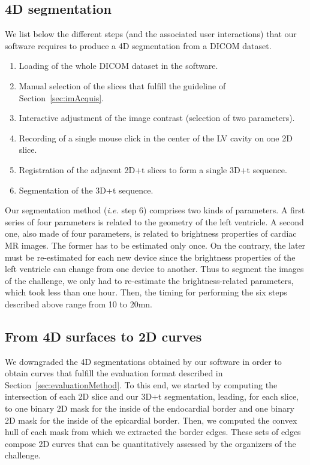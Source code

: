 \documentclass{llncs}
\newcommand{\ie}[0]{{\em i.e.}\xspace}
\begin{document}
\subsection{4D segmentation}
\label{subsec:segmentationSteps}
We list below the different steps (and the associated user
interactions) that our software requires to produce a 4D segmentation
from a DICOM dataset.
\begin{enumerate}
\item Loading of the whole DICOM dataset in the software.
\item Manual selection of the slices that fulfill the guideline of
  Section~\ref{sec:imAcquis}.
\item Interactive adjustment of the image contrast (selection of two
  parameters).
\item Recording of a single mouse click in the center of the LV cavity
  on one 2D slice.
\item Registration of the adjacent 2D+t slices to form a single 3D+t
  sequence.
\item Segmentation of the 3D+t sequence.
\end{enumerate}
%
Our segmentation method (\ie{} step 6) comprises two kinds of
parameters. A first series of four parameters is related to the
geometry of the left ventricle. A second one, also made of four
parameters, is related to brightness properties of cardiac MR
images. The former has to be estimated only once. On the
contrary, the later must be re-estimated for each new device since the
brightness properties of the left ventricle can change from one device
to another. Thus to segment the images of the challenge, we only
had to re-estimate the brightness-related parameters, which took less
than one hour. Then, the timing for performing the six steps described
above range from 10 to 20mn.
%
\subsection{From 4D surfaces to 2D curves}
\label{sec:From4DTo2D}
We downgraded the 4D segmentations obtained by our software in order
to obtain curves that fulfill the evaluation format described in
Section~\ref{sec:evaluationMethod}. To this end, we started by computing
the intersection of each 2D slice and our 3D+t segmentation, leading,
for each slice, to one binary 2D mask for the inside of the
endocardial border and one binary 2D mask for the inside of the
epicardial border. Then, we computed the convex hull of each mask from
which we extracted the border edges. These sets of edges compose 2D
curves that can be quantitatively assessed by the organizers of
the challenge.
%
\end{document}
